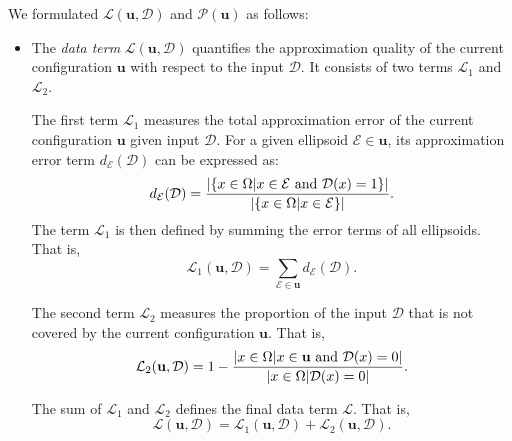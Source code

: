 \documentclass[journal]{IEEEtran}
\begin{document}
We formulated $\mathcal{L}(\mathbf{u}, \mathcal{D})$ and
$\mathcal{P} (\mathbf{u})$ as follows:

\begin{itemize}
\item The \textit{data term} $\mathcal{L}(\mathbf{u}, \mathcal{D})$
  quantifies the approximation quality of the current configuration
  $\mathbf{u}$ with respect to the input $\mathcal{D}$. It consists of
  two terms $\mathcal{L}_1$ and $\mathcal{L}_2$.

  The first term $\mathcal{L}_1$ measures the total approximation
  error of the current configuration $\mathbf{u}$ given input
  $\mathcal{D}$. For a given ellipsoid $\mathcal{E} \in \mathbf{u}$,
  its approximation error term $d_{\mathcal{E}}(\mathcal{D})$ can be
  expressed as:
  \begin{equation}
    \label{eq:data-term1-single}
    d_{\mathcal{E}}(\mathcal{D}) = \frac{ | \{ x \in \Omega | x \in
      \mathcal{E} \textnormal{ and } \mathcal{D}(x) = 1\} | } { |\{ x
      \in \Omega | x \in \mathcal{E} \}| }.
  \end{equation}
  The term $\mathcal{L}_1$ is then defined by summing the error terms
  of all ellipsoids. That is,
  \begin{equation}
    \label{eq:data-term1}
    \mathcal{L}_{1}(\mathbf{u}, \mathcal{D}) = \sum_{\mathcal{E} \in
      \mathbf{u}} d_{\mathcal{E}} (\mathcal{D}).
  \end{equation}

  The second term $\mathcal{L}_2$ measures the proportion of the input
  $\mathcal{D}$ that is not covered by the current configuration
  $\mathbf{u}$. That is,
  \begin{equation}
    \label{eq:data-term2}
    \mathcal{L}_{2}(\mathbf{u}, \mathcal{D}) = 1 -
    \frac{|x \in \Omega| x \in \mathbf{u} \textnormal{ and }
      \mathcal{D}(x) = 0|} {|x \in \Omega| \mathcal{D}(x) = 0|}.
  \end{equation}

  The sum of $\mathcal{L}_1$ and $\mathcal{L}_2$ defines the final
  data term $\mathcal{L}$. That is,
  \begin{equation}
    \label{eq:data-term-final}
    \mathcal{L}(\mathbf{u}, \mathcal{D}) = \mathcal{L}_{1}(\mathbf{u},
    \mathcal{D}) + \mathcal{L}_{2}(\mathbf{u}, \mathcal{D}).
  \end{equation}


\end{itemize}
\end{document}
